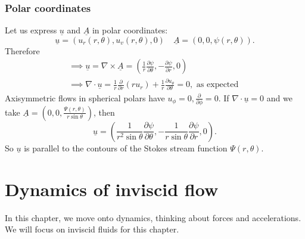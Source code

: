 \documentclass[egregdoesnotlikesansseriftitles,a4paper]{scrartcl}
\renewcommand{\vec}[1]{\underline{#1}}
\begin{document}
\subsubsection{Polar coordinates}
Let us express $\vec{u}$ and $\vec{A}$ in polar coordinates: \[
\vec{u}=(u_{r}(r,\theta), u_{v}(r, \theta),0) \quad \vec{A}=(0,0,\psi (r,\theta))
.\] 
Therefore 
\begin{align*}
    \implies \vec{u}=\nabla \times \vec{A}=(\frac{1}{r} \frac{\partial \psi}{\partial \theta}, -\frac{\partial \psi}{\partial r},0)\\
    \implies \nabla \cdot \vec{u}= \frac{1}{r} \frac{\partial}{\partial r}(ru_{r})+\frac{1}{r} \frac{\partial u_{\theta}}{\partial \theta}=0, \text{ as expected } 
\end{align*}
Axisymmetric flows in spherical polars have $u_{\phi}=0, \frac{\partial }{\partial \phi}=0$. If $\nabla \cdot \vec{u}=0$ and we take $\vec{A}=(0,0, \frac{\Psi (r, \theta)}{r \sin \theta})$, then \[
\vec{u}=\left(\frac{1}{r^2 \sin \theta} \frac{\partial \psi}{\partial \theta}, -\frac{1}{r \sin \theta}\frac{\partial \psi}{\partial r},0 \right)
.\] So $\vec{u}$ is parallel to the contours of the Stokes stream function $\Psi (r,\theta)$.
\section{Dynamics of inviscid flow}
In this chapter, we move onto dynamics, thinking about forces and accelerations. We will focus on inviscid fluids for this chapter.
\end{document}
